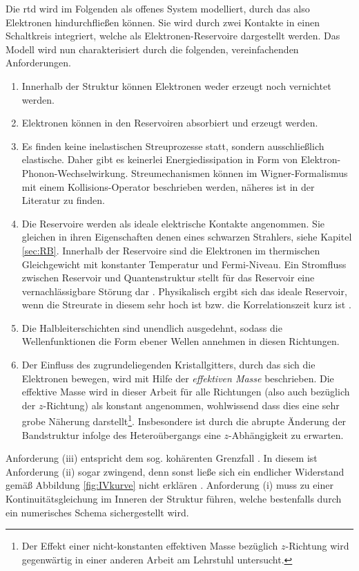 Die \ac{rtd} wird im Folgenden als offenes System modelliert, durch das also Elektronen hindurchfließen können. Sie wird durch zwei Kontakte in einen Schaltkreis integriert, welche als Elektronen-Reservoire dargestellt werden. Das Modell wird nun charakterisiert durch die folgenden, vereinfachenden Anforderungen.
\begin{enumerate}[label=(\roman*)]
  \item Innerhalb der Struktur können Elektronen weder erzeugt noch vernichtet werden.
  \item Elektronen können in den Reservoiren absorbiert und erzeugt werden.
  \item Es finden keine inelastischen Streuprozesse statt, sondern ausschließlich elastische. Daher gibt es keinerlei Energiedissipation in Form von Elektron-Phonon-Wechselwirkung. Streumechanismen können im Wigner-Formalismus mit einem Kollisions-Operator beschrieben werden, näheres ist in der Literatur \cite{wiedenhaus} zu finden.
  \item Die Reservoire werden als ideale elektrische Kontakte angenommen. Sie gleichen in ihren Eigenschaften denen eines schwarzen Strahlers, siehe Kapitel \ref{sec:RB}. Innerhalb der Reservoire sind die Elektronen im thermischen Gleichgewicht mit konstanter Temperatur und Fermi-Niveau. Ein Stromfluss zwischen Reservoir und Quantenstruktur stellt für das Reservoir eine vernachlässigbare Störung dar \cite{frensley3}. Physikalisch ergibt sich das ideale Reservoir, wenn die Streurate in diesem sehr hoch ist bzw. die Korrelationszeit kurz ist \cite{frensley3}.
  \item Die Halbleiterschichten sind unendlich ausgedehnt, sodass die Wellenfunktionen die Form ebener Wellen annehmen in diesen Richtungen.
  \item Der Einfluss des zugrundeliegenden Kristallgitters, durch das sich die Elektronen bewegen, wird mit Hilfe der \emph{effektiven Masse} beschrieben. Die effektive Masse wird in dieser Arbeit für alle Richtungen (also auch bezüglich der $z$-Richtung) als konstant angenommen, wohlwissend dass dies eine sehr grobe Näherung darstellt\footnote{Der Effekt einer nicht-konstanten effektiven Masse bezüglich $z$-Richtung wird gegenwärtig in einer anderen Arbeit am Lehrstuhl untersucht.}. Insbesondere ist durch die abrupte Änderung der Bandstruktur infolge des Heteroübergangs eine $z$-Abhängigkeit zu erwarten.
\end{enumerate}
Anforderung (iii) entspricht dem sog. kohärenten Grenzfall \cite{failure}. In diesem ist Anforderung (ii) sogar zwingend, denn sonst ließe sich ein endlicher Widerstand gemäß Abbildung \ref{fig:IVkurve} nicht erklären \cite{landauer}. Anforderung (i) muss zu einer Kontinuitätsgleichung im Inneren der Struktur führen, welche bestenfalls durch ein numerisches Schema sichergestellt wird. 

